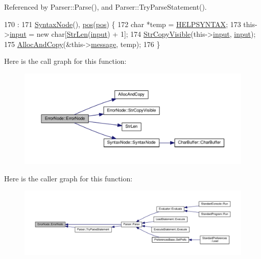 Referenced by Parser\+::\+Parse(), and Parser\+::\+Try\+Parse\+Statement().


\begin{DoxyCode}
170                                                :
171     \hyperlink{classSyntaxNode_ac94372d402f38a118b4e8cd20ba7e520}{SyntaxNode}(), \hyperlink{classErrorNode_a2f9577d7885985f6a5671a14d64a75cf}{pos}(\hyperlink{classErrorNode_a2f9577d7885985f6a5671a14d64a75cf}{pos}) \{
172     \textcolor{keywordtype}{char} *temp = \hyperlink{text_8h_a466f4e6c46f3b09b46f495231a5afc9c}{HELPSYNTAX};
173     this->\hyperlink{classErrorNode_ac2cc563162c10fff090113340184bb4b}{input} = \textcolor{keyword}{new} \textcolor{keywordtype}{char}[\hyperlink{clib_8h_a67ec56eb98b49515d35005a5b3bf9a32}{StrLen}(\hyperlink{classErrorNode_ac2cc563162c10fff090113340184bb4b}{input}) + 1];
174     \hyperlink{classErrorNode_a2e51822b04905fc867d13546af61abb8}{StrCopyVisible}(this->\hyperlink{classErrorNode_ac2cc563162c10fff090113340184bb4b}{input}, \hyperlink{classErrorNode_ac2cc563162c10fff090113340184bb4b}{input});
175     \hyperlink{clib_8h_a5bed05c70cb17e541fee570b5dc32e1a}{AllocAndCopy}(&this->\hyperlink{classErrorNode_abd0f6fbd4876d013fbb7b6a9d5ce673e}{message}, temp);
176 \}
\end{DoxyCode}


Here is the call graph for this function\+:
\nopagebreak
\begin{figure}[H]
\begin{center}
\leavevmode
\includegraphics[width=350pt]{d7/dc9/classErrorNode_ac47d46061f61fb60a5c1cf2a61f24a44_cgraph}
\end{center}
\end{figure}




Here is the caller graph for this function\+:
\nopagebreak
\begin{figure}[H]
\begin{center}
\leavevmode
\includegraphics[width=350pt]{d7/dc9/classErrorNode_ac47d46061f61fb60a5c1cf2a61f24a44_icgraph}
\end{center}
\end{figure}


